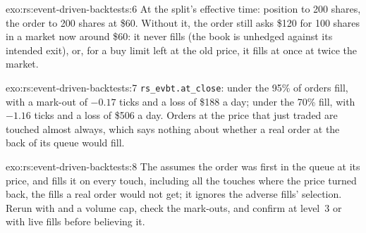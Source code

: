 \begin{solution}{exo:rs:event-driven-backtests:6}
At the split's effective time: position to 200 shares, the order to 200 shares at \$60. Without it, the order still asks \$120 for 100 shares in a market
now around \$60: it never fills (the book is unhedged against its intended exit), or, for a buy limit left at the old price, it fills at once at twice the
market.
\end{solution}

\begin{solution}{exo:rs:event-driven-backtests:7}
\texttt{rs\_evbt.at\_close}: under the  95\% of orders fill, with a mark-out of $-0.17$ ticks and a loss of \$188 a day; under the 
70\% fill, with $-1.16$ ticks and a loss of \$506 a day. Orders at the price that just traded are touched almost always, which says nothing about whether a
real order at the back of its queue would fill.
\end{solution}

\begin{solution}{exo:rs:event-driven-backtests:8}
The  assumes the order was first in the queue at its price, and fills it on every touch, including all the touches where the price turned
back, the fills a real order would not get; it ignores the adverse fills' selection. Rerun with  and a volume cap, check the mark-outs,
and confirm at level~3 or with live fills before believing it.
\end{solution}


